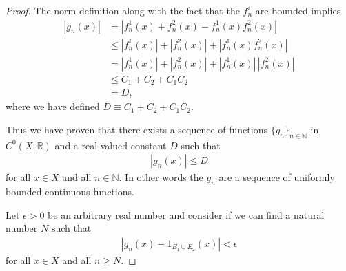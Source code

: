 \begin{proof}
The norm definition along with the fact that the $f^i_n$ are bounded implies
\begin{align}
    \left\lvert g_n(x) \right\rvert &=   \left\lvert f^1_n(x) + f^2_n(x) - f^1_n(x) f^2_n(x) \right\rvert \\
                          &\le \left\lvert f^1_n(x) \right\rvert + \left\lvert f^2_n(x) \right\rvert + \left\lvert f^1_n(x) f^2_n(x) \right\rvert \\
                          &=   \left\lvert f^1_n(x) \right\rvert + \left\lvert f^2_n(x) \right\rvert + \left\lvert f^1_n(x) \right\rvert \, \left\lvert f^2_n(x) \right\rvert \\
                          &\le C_1 + C_2 + C_1 C_2 \\
                          &=   D,
\end{align}
where we have defined $D \equiv C_1 + C_2 + C_1 C_2$.

Thus we have proven that there exists a sequence of functions $\{ g_n \}_{n \in \mathbb{N}}$ in $C^0(X; \mathbb{R})$ and a real-valued constant $D$ such that
\begin{align}
    \left\lvert g_n(x) \right\rvert \le D
\end{align}
for all $x \in X$ and all $n \in \mathbb{N}$. In other words the $g_n$ are a sequence of uniformly bounded continuous functions.

Let $\epsilon > 0$ be an arbitrary real number and consider if we can find a natural number $N$ such that
\begin{align}
    \left\lvert g_n(x) - 1_{E_1 \cup E_2}(x) \right\rvert < \epsilon
\end{align}
for all $x \in X$ and all $n \ge N$.


\end{proof}

